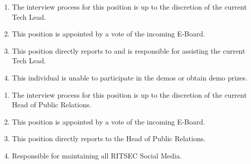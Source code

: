 
\begin{enumerate}
      \item The interview process for this position is up to the discretion of the current
            Tech Lead.
      \item This position is appointed by a vote of the incoming E-Board.
      \item This position directly reports to and is responsible for assisting the current
            Tech Lead.
      \item This individual is unable to participate in the demos or obtain demo prizes.
\end{enumerate}


\begin{enumerate}
      \item The interview process for this position is up to the discretion of the current
            Head of Public Relations.
      \item This position is appointed by a vote of the incoming E-Board.
      \item This position directly reports to the Head of Public Relations.
      \item Responsible for maintaining all RITSEC Social Media.
\end{enumerate}
